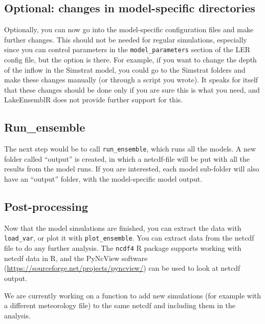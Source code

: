 \documentclass[
]{article}
\begin{document}
\hypertarget{optional-changes-in-model-specific-directories}{%
\subsection{Optional: changes in model-specific
directories}\label{optional-changes-in-model-specific-directories}}

Optionally, you can now go into the model-specific configuration files
and make further changes. This should not be needed for regular
simulations, especially since you can control parameters in the
\texttt{model\_parameters} section of the LER config file, but the
option is there. For example, if you want to change the depth of the
inflow in the Simstrat model, you could go to the Simstrat folders and
make these changes manually (or through a script you wrote). It speaks
for itself that these changes should be done only if you are sure this
is what you need, and LakeEnsemblR does not provide further support for
this.

\hypertarget{run_ensemble}{%
\subsection{Run\_ensemble}\label{run_ensemble}}

The next step would be to call \texttt{run\_ensemble}, which runs all
the models. A new folder called ``output'' is created, in which a
netcdf-file will be put with all the results from the model runs. If you
are interested, each model sub-folder will also have an ``output''
folder, with the model-specific model output.

\hypertarget{post-processing}{%
\subsection{Post-processing}\label{post-processing}}

Now that the model simulations are finished, you can extract the data
with \texttt{load\_var}, or plot it with \texttt{plot\_ensemble}. You
can extract data from the netcdf file to do any further analysis. The
\texttt{ncdf4} R package supports working with netcdf data in R, and the
PyNcView software (\url{https://sourceforge.net/projects/pyncview/}) can
be used to look at netcdf output.

We are currently working on a function to add new simulations (for
example with a different meteorology file) to the same netcdf and
including them in the analysis.
\end{document}
